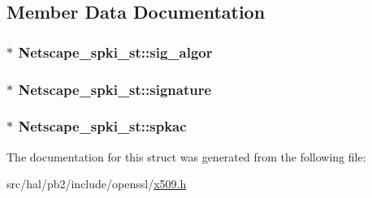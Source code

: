 \subsection{Member Data Documentation}
\subsubsection[{\texorpdfstring{sig\+\_\+algor}{sig_algor}}]{$\ast$ Netscape\+\_\+spki\+\_\+st\+::sig\+\_\+algor}\hypertarget{struct_netscape__spki__st_a490105a4ef783d32f79fd00f72f8aa62}{}\label{struct_netscape__spki__st_a490105a4ef783d32f79fd00f72f8aa62}
\subsubsection[{\texorpdfstring{signature}{signature}}]{$\ast$ Netscape\+\_\+spki\+\_\+st\+::signature}\hypertarget{struct_netscape__spki__st_a8fe9d3a3731234862a6ea254e206140e}{}\label{struct_netscape__spki__st_a8fe9d3a3731234862a6ea254e206140e}
\subsubsection[{\texorpdfstring{spkac}{spkac}}]{$\ast$ Netscape\+\_\+spki\+\_\+st\+::spkac}\hypertarget{struct_netscape__spki__st_a724664bfc3a3f03a4f8238be98807283}{}\label{struct_netscape__spki__st_a724664bfc3a3f03a4f8238be98807283}


The documentation for this struct was generated from the following file\+:\begin{DoxyCompactItemize}
\item 
src/hal/pb2/include/openssl/\hyperlink{x509_8h}{x509.\+h}\end{DoxyCompactItemize}
